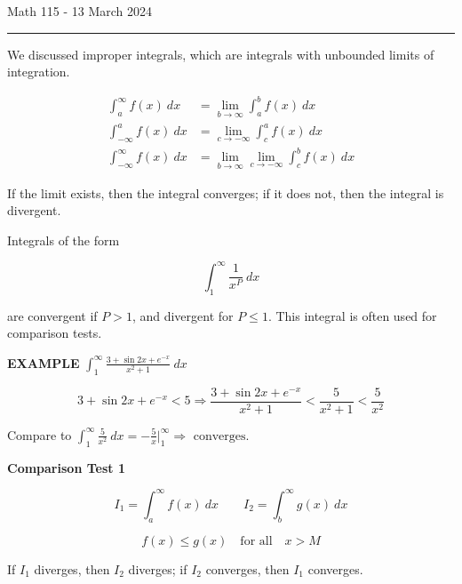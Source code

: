 \documentclass{article}
\begin{document}
Math 115 - 13 March 2024
\hrule

\vspace{10pt}

We discussed improper integrals, which are integrals with unbounded limits of integration.

\begin{align}
\int_a^\infty f(x)\ dx&=\lim_{b\to\infty}\int_a^bf(x)\ dx\\
\int_{-\infty}^a f(x)\ dx&=\lim_{c\to-\infty}\int_c^af(x)\ dx\\
\int_{-\infty}^\infty f(x)\ dx&=\lim_{b\to\infty}\lim_{c\to-\infty}\int_c^bf(x)\ dx
\end{align}

\vspace{10pt}

If the limit exists, then the integral converges; if it does not, then the integral is divergent.

\vspace{10pt}

Integrals of the form

\[\int_1^\infty\frac{1}{x^P}\ dx\]

are convergent if $P>1$, and divergent for $P\leq1$. This integral is often used for comparison tests.

\vspace{10pt}

{\bf{}EXAMPLE} $\displaystyle\int_1^\infty\frac{3+\sin2x+e^{-x}}{x^2+1}\ dx$

\[3+\sin2x+e^{-x}<5\Rightarrow\frac{3+\sin2x+e^{-x}}{x^2+1}<\frac{5}{x^2+1}<\frac{5}{x^2}\]

Compare to $\displaystyle\int_1^\infty\frac{5}{x^2}\ dx=-\frac{5}{x}\big|_1^\infty\Rightarrow\mbox{ converges.}$

\vspace{10pt}

{\bf{}Comparison Test 1}

\[I_1=\int_a^\infty f(x)\ dx\qquad I_2=\int_b^\infty g(x)\ dx\]

\[f(x)\leq g(x)\quad\mbox{for all}\quad x>M\]

If $I_1$ diverges, then $I_2$ diverges; if $I_2$ converges, then $I_1$ converges.

\begin{center}
\end{center}
\end{document}
